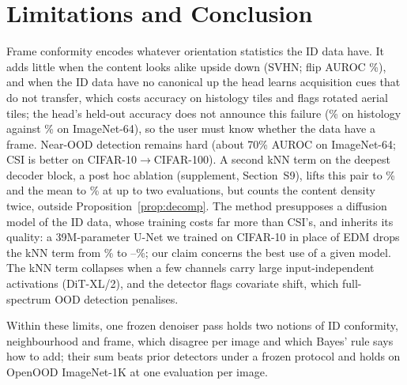\documentclass{article}
\begin{document}
\section{Limitations and Conclusion}
\label{sec:concl}
Frame conformity encodes whatever orientation statistics the ID data have. It adds little when the content looks alike upside down (SVHN; flip AUROC \vfSVHN\%), and when the ID data have no canonical up the head learns acquisition cues that do not transfer, which costs accuracy on histology tiles and flags rotated aerial tiles; the head's held-out accuracy does not announce this failure (\phAcc\% on histology against \cleanAccIN\% on ImageNet-64), so the user must know whether the data have a frame. Near-OOD detection remains hard (about 70\% AUROC on ImageNet-64; CSI is better on CIFAR-10$\to$CIFAR-100). A second kNN term on the deepest decoder block, a post hoc ablation (supplement, Section~S9), lifts this pair to \deepNearCten\% and the mean to \deepMean\% at up to two evaluations, but counts the content density twice, outside Proposition~\ref{prop:decomp}. The method presupposes a diffusion model of the ID data, whose training costs far more than CSI's, and inherits its quality: a 39M-parameter U-Net we trained on CIFAR-10 in place of EDM drops the kNN term from \knnTCten\% to \rgKnnTNatMin--\rgKnnTNatMax\%; our claim concerns the best use of a given model. The kNN term collapses when a few channels carry large input-independent activations (DiT-XL/2), and the detector flags covariate shift, which full-spectrum OOD detection penalises.

Within these limits, one frozen denoiser pass holds two notions of ID conformity, neighbourhood and frame, which disagree per image and which Bayes' rule says how to add; their sum beats \nPrior{} prior detectors under a frozen protocol and holds on OpenOOD ImageNet-1K at one evaluation per image.



\end{document}
